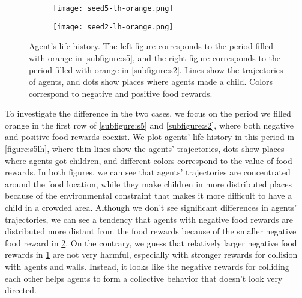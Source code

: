 \begin{figure}[t]
  \begin{subfigure}[t]{7cm}
    \centering
    \texttt{[image: seed5-lh-orange.png]}
    \label{subfigure:s5lh}
  \end{subfigure}
  \begin{subfigure}[t]{7cm}
    \centering
    \texttt{[image: seed2-lh-orange.png]}
    \label{subfigure:s2lh}
  \end{subfigure}
  \caption{
    Agent's life history. The left figure corresponds to the period filled with orange in \cref{subfigure:s5}, and the right figure corresponds to the period filled with orange in \cref{subfigure:s2}. Lines show the trajectories of agents, and dots show places where agents made a child. Colors correspond to negative and positive food rewards.
  }\label{figure:s5-lh}
\end{figure}

To investigate the difference in the two cases, we focus on the period we filled orange in the first row of \cref{subfigure:s5} and \cref{subfigure:s2}, where both negative and positive food rewards coexist. We plot agents' life history in this period in \cref{figure:s5lh}, where thin lines show the agents' trajectories, dots show places where agents got children, and different colors correspond to the value of food rewards. In both figures, we can see that agents' trajectories are concentrated around the food location, while they make children in more distributed places because of the environmental constraint that makes it more difficult to have a child in a crowded area.
Although we don't see significant differences in agents' trajectories, we can see a tendency that agents with negative food rewards are distributed more distant from the food rewards because of the smaller negative food reward in \cref{subfigure:s2lh}. On the contrary, we guess that relatively larger negative food rewards in \cref{subfigure:s5lh} are not very harmful, especially with stronger rewards for collision with agents and walls. Instead, it looks like the negative rewards for colliding each other helps agents to form a collective behavior that doesn't look very directed.


